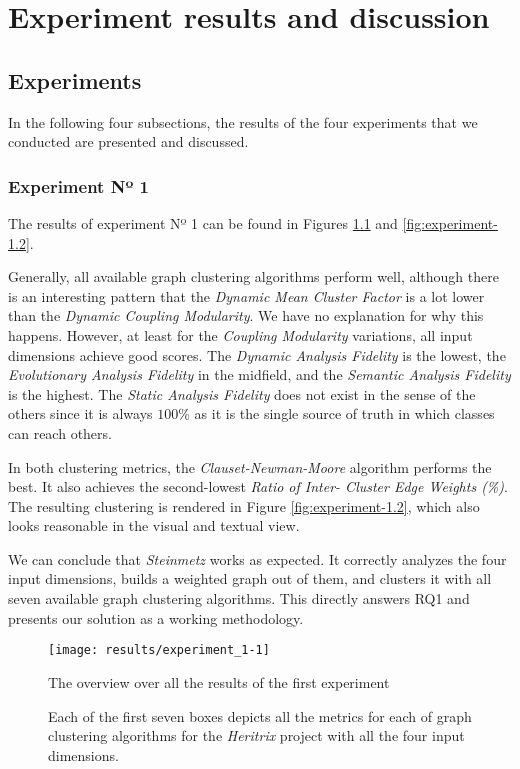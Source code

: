 \documentclass[12pt,a4paper]{report}
\begin{document}
\chapter{Experiment results and discussion} \label{chap:evaluation}

\section{Experiments}

In the following four subsections, the results of the four experiments that
we conducted are presented and discussed.


\subsection{Experiment Nº 1}

The results of experiment Nº 1 can be found in Figures \ref{fig:experiment-1.1}
and \ref{fig:experiment-1.2}.

Generally, all available graph clustering algorithms perform well, although
there is an interesting pattern that the \textit{Dynamic Mean Cluster Factor}
is a lot lower than the \textit{Dynamic Coupling Modularity}. We have no
explanation for why this happens. However, at least for the \textit{Coupling
Modularity} variations, all input dimensions achieve good scores. The
\textit{Dynamic Analysis Fidelity} is the lowest, the
\textit{Evolutionary Analysis Fidelity} in the midfield, and the
\textit{Semantic Analysis Fidelity} is the highest.
The \textit{Static Analysis Fidelity} does not exist in the sense of
the others since it is always $100\%$ as it is the single source of truth in
which classes can reach others.

In both clustering metrics, the \textit{Clauset-Newman-Moore} algorithm
performs the best. It also achieves the second-lowest
\textit{Ratio of Inter- Cluster Edge Weights (\%)}.
The resulting clustering is rendered in Figure \ref{fig:experiment-1.2},
which also looks reasonable in the visual and textual view.

We can conclude that \textit{Steinmetz} works as expected. It correctly
analyzes the four input dimensions, builds a weighted graph out of them, and
clusters it with all seven available graph clustering algorithms. This directly
answers RQ1 and presents our solution as a working methodology.

\begin{figure}[htbp]
\centering
\texttt{[image: results/experiment\_1-1]}
\caption{The overview over all the results of the first experiment}
\caption*{\centering
  Each of the first seven boxes depicts all the metrics for each of graph clustering algorithms for the \textit{Heritrix} project with all the four input dimensions.
}
\label{fig:experiment-1.1}
\end{figure}
\end{document}
